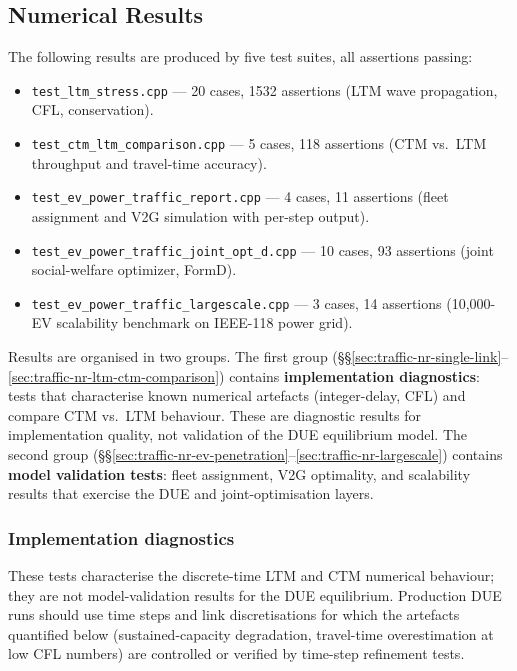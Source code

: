 \subsection{Numerical Results}
\label{sec:traffic-numerical-results}

The following results are produced by five test suites, all assertions
passing:
\begin{itemize}
  \item \texttt{test\_ltm\_stress.cpp} — 20 cases, 1532 assertions
        (LTM wave propagation, CFL, conservation).
  \item \texttt{test\_ctm\_ltm\_comparison.cpp} — 5 cases, 118 assertions
        (CTM vs.\ LTM throughput and travel-time accuracy).
  \item \texttt{test\_ev\_power\_traffic\_report.cpp} — 4 cases, 11 assertions
        (fleet assignment and V2G simulation with per-step output).
  \item \texttt{test\_ev\_power\_traffic\_joint\_opt\_d.cpp} — 10 cases, 93 assertions
        (joint social-welfare optimizer, FormD).
  \item \texttt{test\_ev\_power\_traffic\_largescale.cpp} — 3 cases, 14 assertions
        (10,000-EV scalability benchmark on IEEE-118 power grid).
\end{itemize}

Results are organised in two groups.  The first group
(\S\S\ref{sec:traffic-nr-single-link}--\ref{sec:traffic-nr-ltm-ctm-comparison})
contains \textbf{implementation diagnostics}: tests that characterise
known numerical artefacts (integer-delay, CFL) and compare CTM vs.\ LTM
behaviour.  These are diagnostic results for implementation quality, not
validation of the DUE equilibrium model.  The second group
(\S\S\ref{sec:traffic-nr-ev-penetration}--\ref{sec:traffic-nr-largescale})
contains \textbf{model validation tests}: fleet assignment, V2G
optimality, and scalability results that exercise the DUE and
joint-optimisation layers.

\subsubsection{Implementation diagnostics}

These tests characterise the discrete-time LTM and CTM numerical
behaviour; they are not model-validation results for the DUE equilibrium.
Production DUE runs should use time steps and link discretisations for
which the artefacts quantified below (sustained-capacity degradation,
travel-time overestimation at low CFL numbers) are controlled or verified
by time-step refinement tests.

